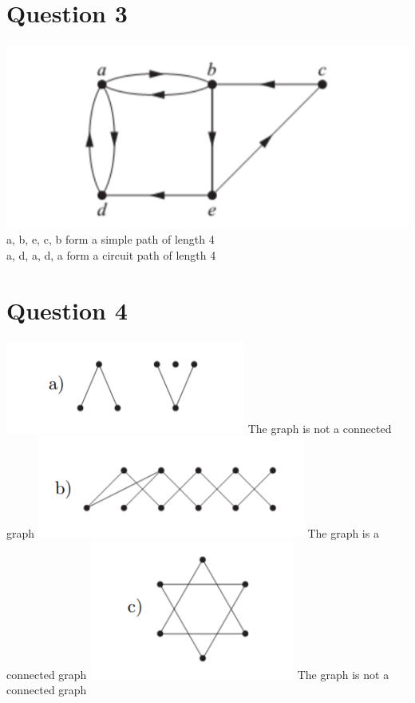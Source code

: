 \documentclass{article}
\begin{document}
\section*{Question 3}
\includegraphics[]{Question 3/connectivity_3.png}
\newline
a, b, e, c, b form a simple path of length 4\\
a, d, a, d, a form a circuit path of length 4

\section*{Question 4}
\includegraphics[]{Question 4/connectivity_4.a.png}
\newline
The graph is not a connected graph
\newline
\includegraphics[]{Question 4/connectivity_4.b.png}
\newline
The graph is a connected graph
\newline
\includegraphics[]{Question 4/connectivity_4.c.png}
\newline
The graph is not a connected graph
\newline
\end{document}
